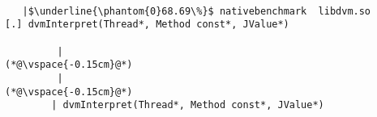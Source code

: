 
\begin{lstlisting}[caption=20 viiteparametria Java$\to$C , label=profile:J2CBenchmark00206, numberbychapter=true, frame=lines, float, floatplacement=t]

   |$\underline{\phantom{0}68.69\%}$ nativebenchmark  libdvm.so           [.] dvmInterpret(Thread*, Method const*, JValue*)

         |
(*@\vspace{-0.15cm}@*)
         |
(*@\vspace{-0.15cm}@*)
        | dvmInterpret(Thread*, Method const*, JValue*)


\end{lstlisting}
